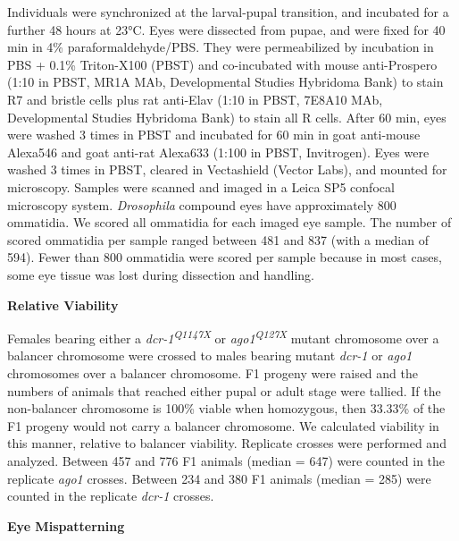 Individuals were synchronized at the larval-pupal transition, and incubated for a further 48 hours at 23°C. Eyes were dissected from pupae, and were fixed for 40 min in 4\% paraformaldehyde/PBS. They were permeabilized by incubation in PBS + 0.1\% Triton-X100 (PBST) and co-incubated with mouse anti-Prospero (1:10 in PBST, MR1A MAb, Developmental Studies Hybridoma Bank) to stain R7 and bristle cells plus rat anti-Elav (1:10 in PBST, 7E8A10 MAb, Developmental Studies Hybridoma Bank) to stain all R cells. After 60 min, eyes were washed 3 times in PBST and incubated for 60 min in goat anti-mouse Alexa546 and goat anti-rat Alexa633 (1:100 in PBST, Invitrogen). Eyes were washed 3 times in PBST, cleared in Vectashield (Vector Labs), and mounted for microscopy. Samples were scanned and imaged in a Leica SP5 confocal microscopy system. \emph{Drosophila} compound eyes have approximately 800 ommatidia. We scored all ommatidia for each imaged eye sample. The number of scored ommatidia per sample ranged between 481 and 837 (with a median of 594). Fewer than 800 ommatidia were scored per sample because in most cases, some eye tissue was lost during dissection and handling.

\textbf{Relative Viability}

Females bearing either a \emph{dcr-1\textsuperscript{Q1147X}} or \emph{ago1\textsuperscript{Q127X}} mutant chromosome over a balancer chromosome were crossed to males bearing mutant \emph{dcr-1} or \emph{ago1} chromosomes over a balancer chromosome. F1 progeny were raised and the numbers of animals that reached either pupal or adult stage were tallied. If the non-balancer chromosome is 100\% viable when homozygous, then 33.33\% of the F1 progeny would not carry a balancer chromosome. We calculated viability in this manner, relative to balancer viability. Replicate crosses were performed and analyzed. Between 457 and 776 F1 animals (median = 647) were counted in the replicate \emph{ago1} crosses. Between 234 and 380 F1 animals (median = 285) were counted in the replicate \emph{dcr-1} crosses.

\textbf{Eye Mispatterning}

